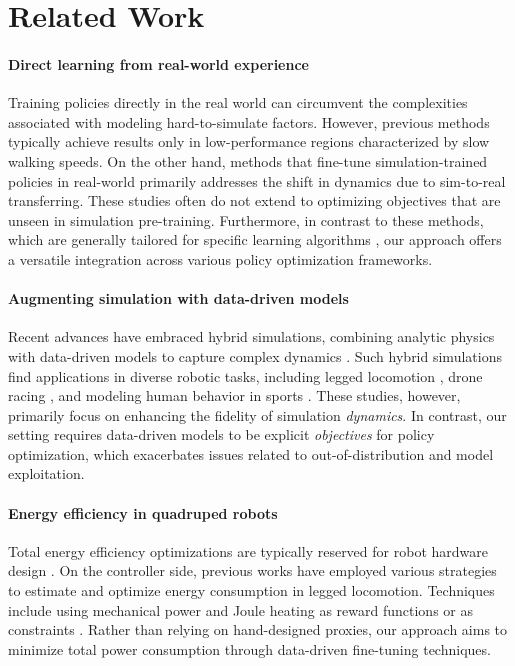 \section{Related Work}
\paragraph{Direct learning from real-world experience}
Training policies directly in the real world can circumvent the complexities associated with modeling hard-to-simulate factors. However, previous methods \cite{ha2020learning, haarnoja2018learning, smith2022walk, smith2023grow} typically achieve results only in low-performance regions characterized by slow walking speeds. On the other hand, methods that fine-tune simulation-trained policies in real-world \cite{smith2022legged, lei2023uni, shi2024efficient} primarily addresses the shift in dynamics due to sim-to-real transferring. These studies often do not extend to optimizing objectives that are unseen in simulation pre-training. Furthermore, in contrast to these methods, which are generally tailored for specific learning algorithms \cite{hiraoka2021dropout, shao2020controlvae}, our approach offers a versatile integration across various policy optimization frameworks.




\paragraph{Augmenting simulation with data-driven models} 
Recent advances have embraced hybrid simulations, combining analytic physics with data-driven models to capture complex dynamics \cite{heiden2021neuralsim,qiao2021efficient,heiden2022inferring,sanchez2020learning,ajay2018augmenting}. Such hybrid simulations find applications in diverse robotic tasks, including legged locomotion \cite{hwangbo2019learning, margolis2023walk}, drone racing \cite{kaufmann2023champion},  and modeling human behavior in sports \cite{abeyruwan2023sim2real}. These studies, however, primarily focus on enhancing the fidelity of simulation \textit{dynamics}. In contrast, our setting requires data-driven models to be explicit \textit{objectives} for policy optimization, which exacerbates issues related to out-of-distribution and model exploitation.

\paragraph{Energy efficiency in quadruped robots} 
Total energy efficiency optimizations are typically reserved for robot hardware design \cite{seok2014design, katz2019mini, krimsky2024elastic}. On the controller side, previous works have employed various strategies to estimate and optimize energy consumption in legged locomotion. Techniques include using mechanical power and Joule heating as reward functions \cite{hwangbo2019learning, rudin2022learning, margolis2024rapid, margolis2023walk, agarwal2023legged, zhuang2023robot, yang2022fast, fu2021minimizing} or as constraints \cite{mahankali2024maximizing, kim2024not, chane2024cat}. Rather than relying on hand-designed proxies, our approach aims to minimize total power consumption through data-driven fine-tuning techniques.